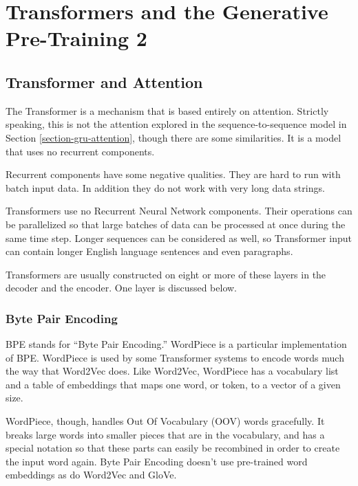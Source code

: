 \chapter{Transformers and the Generative Pre-Training 2}
\label{chapter-transformer}

\section{Transformer and Attention}

\label{transformer-intro}

The Transformer is a mechanism that is based entirely on attention. Strictly speaking, this is not the attention explored in the sequence-to-sequence model in Section \ref{section-gru-attention}, though there are some similarities. It is a model that uses no recurrent components.

Recurrent components have some negative qualities. They are hard to run with batch input data. In addition they do not work with very long data strings. 


Transformers use no Recurrent Neural Network components. Their operations can be parallelized so that large batches of data can be processed at once during the same time step. Longer sequences can be considered as well, so Transformer input can contain longer English language sentences and even paragraphs. 

Transformers are usually constructed on eight or more of these layers in the decoder and the encoder. One layer is discussed below.

\subsection{Byte Pair Encoding}

\ac{BPE} stands for ``Byte Pair Encoding.'' WordPiece is a particular implementation of BPE. WordPiece is used by some Transformer systems to encode words much the way that Word2Vec does. Like Word2Vec, WordPiece  has a vocabulary list and a table of embeddings that maps one word, or token, to a vector of a given size.

WordPiece, though, handles Out Of Vocabulary (\ac{OOV}) words gracefully. It breaks large words into smaller pieces that are in the vocabulary, and has a special notation so that these parts can easily be recombined in order to create the input word again. Byte Pair Encoding doesn't use pre-trained word embeddings as do Word2Vec and GloVe.

